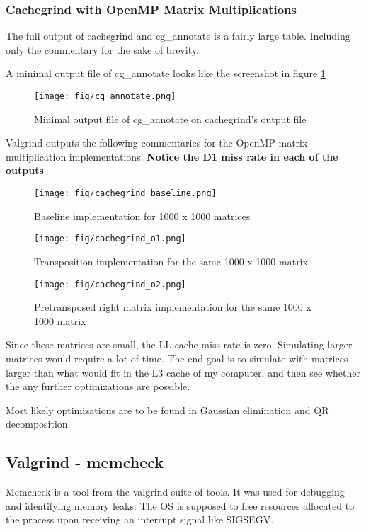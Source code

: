 \documentclass[a4paper]{article}
\begin{document}
\subsubsection*{Cachegrind with OpenMP Matrix Multiplications}
The full output of cachegrind and cg\_annotate is a fairly large
table. Including only the commentary for the sake of brevity.

A minimal output file of cg\_annotate looks like the screenshot
in figure \ref{fig:fig-cg_annotate-png}
\begin{figure}[h!]
    \centering
    \texttt{[image: fig/cg\_annotate.png]}
    \caption{Minimal output file of cg\_annotate on cachegrind's output file}
    \label{fig:fig-cg_annotate-png}
\end{figure}

Valgrind outputs the following commentaries for the OpenMP matrix
multiplication implementations. \textbf{Notice the D1 miss rate in each of the outputs}

\begin{figure}[h!]
    \centering
    \texttt{[image: fig/cachegrind\_baseline.png]}
    \caption{Baseline implementation for 1000 x 1000 matrices}
    \label{fig:fig-cachegrind_baseline-png}
\end{figure}
\begin{figure}[h!]
    \centering
    \texttt{[image: fig/cachegrind\_o1.png]}
    \caption{Transposition implementation for the same 1000 x 1000 matrix}
    \label{fig:fig-cachegrind_o1-png}
\end{figure}    
\begin{figure}[h!]
    \centering
    \texttt{[image: fig/cachegrind\_o2.png]}
    \caption{Pretransposed right matrix implementation for the same 1000 x 1000 matrix}
    \label{fig:fig-cachegrind_o2-png}
\end{figure}

Since these matrices are small, the LL cache miss rate is zero.
Simulating larger matrices would require a lot of time. The end
goal is to simulate with matrices larger than what would fit
in the L3 cache of my computer, and then see whether the any further optimizations are possible.

Most likely optimizations are to be found in Gaussian elimination and
QR decomposition.

\subsection*{Valgrind - memcheck}
Memcheck is a tool from the valgrind suite of tools. It was used
for debugging and identifying memory leaks. The OS is
supposed to free resources allocated to the process upon
receiving an interrupt signal like SIGSEGV. 
\end{document}
